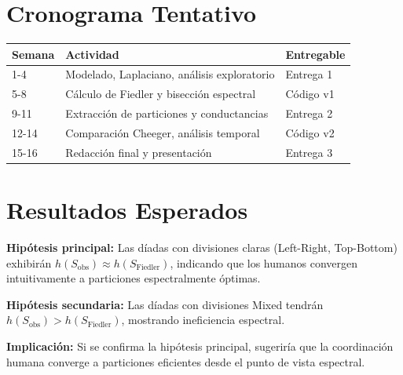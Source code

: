 \documentclass[conference]{IEEEtran}
\begin{document}
\section{Cronograma Tentativo}

\begin{tabular}{|l|l|l|}
\hline
\textbf{Semana} & \textbf{Actividad} & \textbf{Entregable} \\
\hline
1-4 & Modelado, Laplaciano, análisis exploratorio & Entrega 1 \\
5-8 & Cálculo de Fiedler y bisección espectral & Código v1 \\
9-11 & Extracción de particiones y conductancias & Entrega 2 \\
12-14 & Comparación Cheeger, análisis temporal & Código v2 \\
15-16 & Redacción final y presentación & Entrega 3 \\
\hline
\end{tabular}

\section{Resultados Esperados}

\textbf{Hipótesis principal:} Las díadas con divisiones claras (Left-Right, Top-Bottom) exhibirán $h(S_{\text{obs}}) \approx h(S_{\text{Fiedler}})$, indicando que los humanos convergen intuitivamente a particiones espectralmente óptimas.

\textbf{Hipótesis secundaria:} Las díadas con divisiones Mixed tendrán $h(S_{\text{obs}}) > h(S_{\text{Fiedler}})$, mostrando ineficiencia espectral.

\textbf{Implicación:} Si se confirma la hipótesis principal, sugeriría que la coordinación humana converge a particiones eficientes desde el punto de vista espectral.
\end{document}
